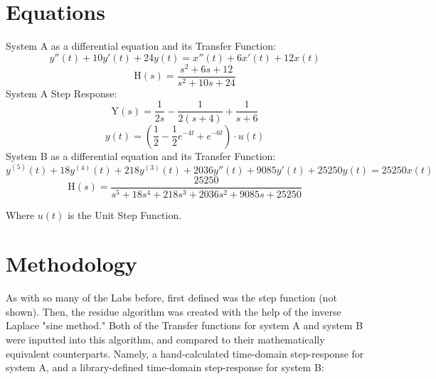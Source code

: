 \documentclass[12pt]{report}
\begin{document}
\section{Equations}

System A as a differential equation and its Transfer Function:
\begin{equation}
    y''(t) + 10y'(t)+24y(t)=x''(t)+6x'(t)+12x(t)
\end{equation}
\begin{equation}
    \text{H}(s) = \frac{s^{2} + 6s+12}{s^{2}+10s+24}
\end{equation}
System A Step Response:
\begin{equation}
    \text{Y}(s) = \frac{1}{2s} - \frac{1}{2(s+4)} + \frac{1}{s+6}
\end{equation}
\begin{equation}
    y(t) = \left(\frac{1}{2} - \frac{1}{2}e^{-4t} + e^{-6t}\right) \cdot u(t)
\end{equation}
System B as a differential equation and its Transfer Function:
\begin{equation}
    y^{(5)}(t)+18y^{(4)}(t)+218y^{(3)}(t)+2036y''(t)+9085y'(t)+25250y(t)=25250x(t)
\end{equation}
\begin{equation}
    \text{H}(s) = \frac{25250}{s^{5}+18s^{4}+218s^{3}+2036s^{2}+9085s+25250}
\end{equation}

Where $u(t)$ is the Unit Step Function.
\pagebreak


\section{Methodology}
As with so many of the Labs before, first defined was the step function (not shown). Then, the residue algorithm was created with the help of the inverse Laplace "sine method." Both of the Transfer functions for system A and system B were inputted into this algorithm, and compared to their mathematically equivalent counterparts. Namely, a hand-calculated time-domain step-response for system A, and a library-defined time-domain step-response for system B:
\end{document}
